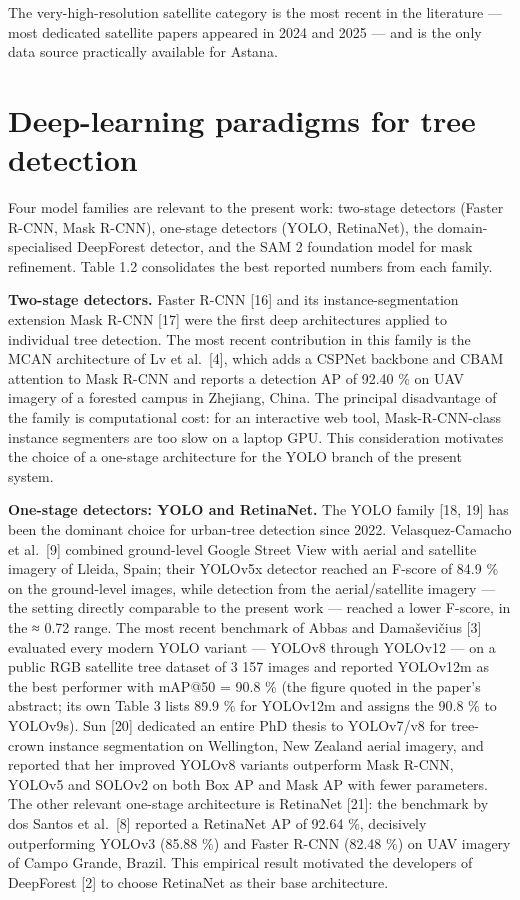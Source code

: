 The very-high-resolution satellite category is the most recent in the literature --- most dedicated satellite papers appeared in 2024 and 2025 --- and is the only data source practically available for Astana.

\section{Deep-learning paradigms for tree detection}\label{deep-learning-paradigms-for-tree-detection}

Four model families are relevant to the present work: two-stage detectors (Faster R-CNN, Mask R-CNN), one-stage detectors (YOLO, RetinaNet), the domain-specialised DeepForest detector, and the SAM 2 foundation model for mask refinement. Table 1.2 consolidates the best reported numbers from each family.

\textbf{Two-stage detectors.} Faster R-CNN {[}16{]} and its instance-segmentation extension Mask R-CNN {[}17{]} were the first deep architectures applied to individual tree detection. The most recent contribution in this family is the MCAN architecture of Lv et al.~{[}4{]}, which adds a CSPNet backbone and CBAM attention to Mask R-CNN and reports a detection AP of 92.40 \% on UAV imagery of a forested campus in Zhejiang, China. The principal disadvantage of the family is computational cost: for an interactive web tool, Mask-R-CNN-class instance segmenters are too slow on a laptop GPU. This consideration motivates the choice of a one-stage architecture for the YOLO branch of the present system.

\textbf{One-stage detectors: YOLO and RetinaNet.} The YOLO family {[}18, 19{]} has been the dominant choice for urban-tree detection since 2022. Velasquez-Camacho et al.~{[}9{]} combined ground-level Google Street View with aerial and satellite imagery of Lleida, Spain; their YOLOv5x detector reached an F-score of 84.9 \% on the ground-level images, while detection from the aerial/satellite imagery --- the setting directly comparable to the present work --- reached a lower F-score, in the ≈ 0.72 range. The most recent benchmark of Abbas and Damaševičius {[}3{]} evaluated every modern YOLO variant --- YOLOv8 through YOLOv12 --- on a public RGB satellite tree dataset of 3 157 images and reported YOLOv12m as the best performer with mAP@50 = 90.8 \% (the figure quoted in the paper's abstract; its own Table 3 lists 89.9 \% for YOLOv12m and assigns the 90.8 \% to YOLOv9s). Sun {[}20{]} dedicated an entire PhD thesis to YOLOv7/v8 for tree-crown instance segmentation on Wellington, New Zealand aerial imagery, and reported that her improved YOLOv8 variants outperform Mask R-CNN, YOLOv5 and SOLOv2 on both Box AP and Mask AP with fewer parameters. The other relevant one-stage architecture is RetinaNet {[}21{]}: the benchmark by dos Santos et al.~{[}8{]} reported a RetinaNet AP of 92.64 \%, decisively outperforming YOLOv3 (85.88 \%) and Faster R-CNN (82.48 \%) on UAV imagery of Campo Grande, Brazil. This empirical result motivated the developers of DeepForest {[}2{]} to choose RetinaNet as their base architecture.

